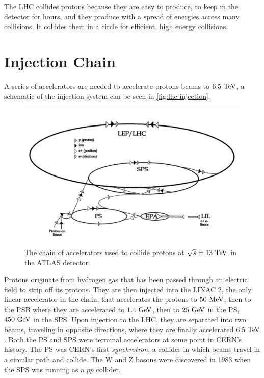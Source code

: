 The \ac{LHC} collides protons because they are easy to produce, to keep in the detector for hours, and they produce with a spread of energies across many collisions. It collides them in a circle for efficient, high energy collisions. 





\section{Injection Chain}

A series of accelerators are needed to accelerate protons beams to $6.5 \TeV$, a schematic of the injection system can be seen in \autoref{fig:lhc-injection}. 

\begin{figure}[htbp]
\centering
\includegraphics[width=.8\textwidth]{figures/Detector/lhc-injectors.png}
\caption{The chain of accelerators used to collide protons at $\sqrt{s} = 13 \TeV$ in the \ac{ATLAS} detector. \cite{accelerator-sketch} }
\label{fig:lhc-injection}
\end{figure}

Protons originate from hydrogen gas that has been passed through an electric field to strip off its protons. They are then injected into the \ac{LINAC} 2, the only linear accelerator in the chain, that accelerates the protons to $50 \MeV$, then to the \ac{PSB} where they are accelerated to $1.4 \GeV$, then to $25 \GeV$ in the \ac{PS}, $450 \GeV$ in the \ac{SPS}. Upon injection to the \ac{LHC}, they are separated into two beams, traveling in opposite directions, where they are finally accelerated $6.5 \TeV$. Both the \ac{PS} and \ac{SPS} were terminal accelerators at some point in \ac{CERN}'s history. The \ac{PS} was \ac{CERN}'s first \emph{synchrotron}, a collider in which beams travel in a circular path and collide. The W and Z bosons were discovered in 1983 when the \ac{SPS} was running as a $p\bar{p}$ collider.

